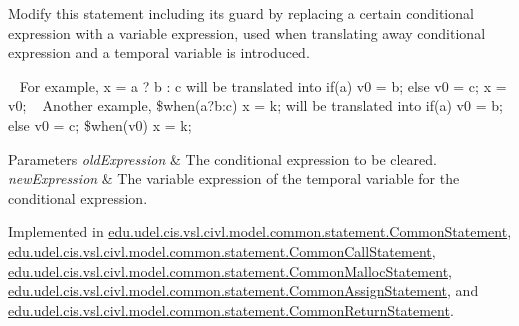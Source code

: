 Modify this statement including its guard by replacing a certain conditional expression with a variable expression, used when translating away conditional expression and a temporal variable is introduced. 

~\newline
 For example, {\ttfamily x = a ? b \+: c} will be translated into {\ttfamily  if(a) v0 = b; else v0 = c; x = v0; }~\newline
 Another example, {\ttfamily  \$when(a?b\+:c) x = k;} will be translated into {\ttfamily  if(a) v0 = b; else v0 = c; \$when(v0) x = k; }


\begin{DoxyParams}{Parameters}
{\em old\+Expression} & The conditional expression to be cleared. \\
\hline
{\em new\+Expression} & The variable expression of the temporal variable for the conditional expression. \\
\hline
\end{DoxyParams}


Implemented in \hyperlink{classedu_1_1udel_1_1cis_1_1vsl_1_1civl_1_1model_1_1common_1_1statement_1_1CommonStatement_a1a118e5f817744bbd084db23f06e9f61}{edu.\+udel.\+cis.\+vsl.\+civl.\+model.\+common.\+statement.\+Common\+Statement}, \hyperlink{classedu_1_1udel_1_1cis_1_1vsl_1_1civl_1_1model_1_1common_1_1statement_1_1CommonCallStatement_a5e8ca532838b49a10c6f23a87b2bf168}{edu.\+udel.\+cis.\+vsl.\+civl.\+model.\+common.\+statement.\+Common\+Call\+Statement}, \hyperlink{classedu_1_1udel_1_1cis_1_1vsl_1_1civl_1_1model_1_1common_1_1statement_1_1CommonMallocStatement_a9b00c60d1a6baa20d37dd84325689362}{edu.\+udel.\+cis.\+vsl.\+civl.\+model.\+common.\+statement.\+Common\+Malloc\+Statement}, \hyperlink{classedu_1_1udel_1_1cis_1_1vsl_1_1civl_1_1model_1_1common_1_1statement_1_1CommonAssignStatement_a18926fbb79d98128381f514aea009534}{edu.\+udel.\+cis.\+vsl.\+civl.\+model.\+common.\+statement.\+Common\+Assign\+Statement}, and \hyperlink{classedu_1_1udel_1_1cis_1_1vsl_1_1civl_1_1model_1_1common_1_1statement_1_1CommonReturnStatement_a7c7864e80b26c47300ebb4d58fb5d03e}{edu.\+udel.\+cis.\+vsl.\+civl.\+model.\+common.\+statement.\+Common\+Return\+Statement}.

\hypertarget{interfaceedu_1_1udel_1_1cis_1_1vsl_1_1civl_1_1model_1_1IF_1_1statement_1_1Statement_a079bd60264722bf7f9ed3d8ba1b0e188}{}

